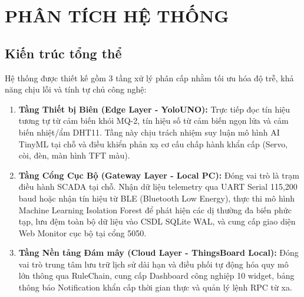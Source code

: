 \section{PHÂN TÍCH HỆ THỐNG}

\subsection{Kiến trúc tổng thể}
Hệ thống được thiết kế gồm 3 tầng xử lý phân cấp nhằm tối ưu hóa độ trễ, khả năng chịu lỗi và tính tự chủ công nghệ:
\begin{enumerate}
    \item \textbf{Tầng Thiết bị Biên (Edge Layer - YoloUNO):} Trực tiếp đọc tín hiệu tương tự từ cảm biến khói MQ-2, tín hiệu số từ cảm biến ngọn lửa và cảm biến nhiệt/ẩm DHT11. Tầng này chịu trách nhiệm suy luận mô hình AI TinyML tại chỗ và điều khiển phản xạ cơ cấu chấp hành khẩn cấp (Servo, còi, đèn, màn hình TFT màu).
    \item \textbf{Tầng Cổng Cục Bộ (Gateway Layer - Local PC):} Đóng vai trò là trạm điều hành SCADA tại chỗ. Nhận dữ liệu telemetry qua UART Serial 115,200 baud hoặc nhận tín hiệu từ BLE (Bluetooth Low Energy), thực thi mô hình Machine Learning Isolation Forest để phát hiện các dị thường đa biến phức tạp, lưu đệm toàn bộ dữ liệu vào CSDL SQLite WAL, và cung cấp giao diện Web Monitor cục bộ tại cổng 5050.
    \item \textbf{Tầng Nền tảng Đám mây (Cloud Layer - ThingsBoard Local):} Đóng vai trò trung tâm lưu trữ lịch sử dài hạn và điều phối tự động hóa quy mô lớn thông qua RuleChain, cung cấp Dashboard công nghiệp 10 widget, bảng thông báo Notification khẩn cấp thời gian thực và quản lý lệnh RPC từ xa.
\end{enumerate}

